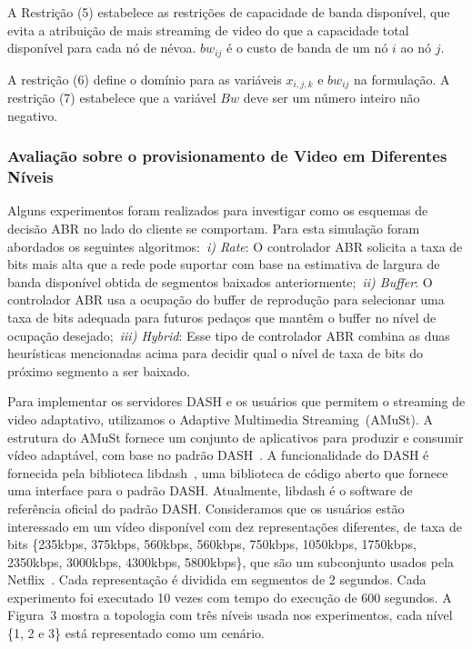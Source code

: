 A Restrição (5) estabelece as restrições de capacidade de banda disponível, que evita a atribuição de mais streaming de video do que a capacidade total disponível para cada nó de névoa. $bw_{ij}$ é o custo de banda de um nó $i$ ao nó $j$. 

A restrição (6) define o domínio para as variáveis $x_{i, j, k}$ e $bw_{ij}$ na formulação. A restrição (7) estabelece que a variável $Bw$ deve ser um número inteiro não negativo.

\subsubsection{Avaliação sobre o provisionamento de Video em Diferentes Níveis}
\label{subsec:evaluation}

Alguns experimentos foram realizados para investigar como os esquemas de decisão ABR no lado do cliente se comportam. Para esta simulação foram abordados os seguintes algoritmos:~\textit{i) Rate}: O controlador ABR solicita a taxa de bits mais alta
que a rede pode suportar com base na estimativa de largura de banda disponível obtida de segmentos baixados anteriormente;~\textit{ii) Buffer}: O controlador ABR usa a ocupação do buffer de reprodução para selecionar uma taxa de bits adequada para futuros pedaços que mantêm o buffer no nível de ocupação desejado;~\textit{iii) Hybrid}: Esse tipo de controlador ABR combina as duas heurísticas mencionadas acima para decidir qual o nível de taxa de bits do próximo segmento a ser baixado.


Para implementar os servidores DASH e os usuários que permitem o streaming de video adaptativo, utilizamos o Adaptive Multimedia Streaming~(AMuSt).
A estrutura do AMuSt fornece um conjunto de aplicativos para produzir e consumir vídeo adaptável, com base no padrão DASH~\cite{kreuzberger2016amust}. A funcionalidade do DASH é fornecida pela biblioteca libdash~\cite{mueller2013ICMEW}, uma biblioteca de código aberto que fornece uma interface para o padrão DASH. Atualmente, libdash é o software de referência oficial do padrão DASH.
Consideramos que os usuários estão interessado em um vídeo disponível com dez representações diferentes, de taxa de bits \{235kbps, 375kbps, 560kbps, 560kbps, 750kbps, 1050kbps, 1750kbps, 2350kbps, 3000kbps, 4300kbps, 5800kbps\}, que são um subconjunto usados pela Netflix~\cite{netflix:representation}.
Cada representação é dividida em segmentos de 2 segundos. Cada experimento foi executado 10 vezes com tempo do execução de 600 segundos. A Figura~3 mostra a topologia com três níveis usada nos experimentos, cada nível \{1, 2 e 3\} está representado como um cenário.  

